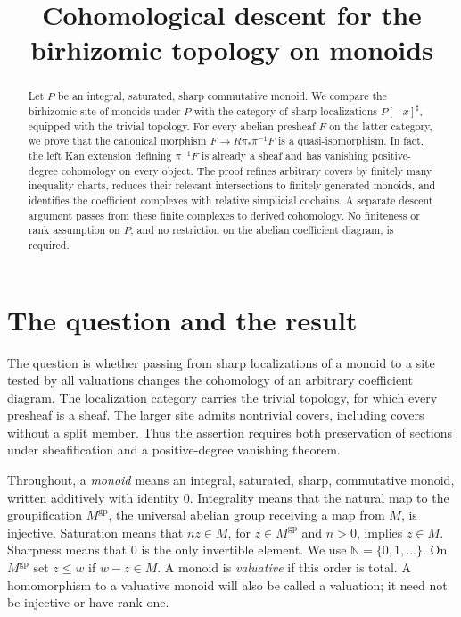 \documentclass[11pt]{article}
\title{Cohomological descent for the birhizomic topology on monoids}
\author{}
\date{}
\theoremstyle{definition}
\theoremstyle{remark}
\newcommand{\N}{\mathbb N}
\newcommand{\gp}{\mathrm{gp}}
\begin{document}
\maketitle

\begin{abstract}
Let $P$ be an integral, saturated, sharp commutative monoid. We compare the birhizomic site of monoids under $P$ with the category of sharp localizations $P[-x]^\sharp$, equipped with the trivial topology. For every abelian presheaf $F$ on the latter category, we prove that the canonical morphism $F\to R\pi_*\pi^{-1}F$ is a quasi-isomorphism. In fact, the left Kan extension defining $\pi^{-1}F$ is already a sheaf and has vanishing positive-degree cohomology on every object. The proof refines arbitrary covers by finitely many inequality charts, reduces their relevant intersections to finitely generated monoids, and identifies the coefficient complexes with relative simplicial cochains. A separate descent argument passes from these finite complexes to derived cohomology. No finiteness or rank assumption on $P$, and no restriction on the abelian coefficient diagram, is required.
\end{abstract}

\section{The question and the result}

The question is whether passing from sharp localizations of a monoid to a site tested by all valuations changes the cohomology of an arbitrary coefficient diagram. The localization category carries the trivial topology, for which every presheaf is a sheaf. The larger site admits nontrivial covers, including covers without a split member. Thus the assertion requires both preservation of sections under sheafification and a positive-degree vanishing theorem.

Throughout, a \emph{monoid} means an integral, saturated, sharp, commutative monoid, written additively with identity $0$. Integrality means that the natural map to the groupification $M^{\gp}$, the universal abelian group receiving a map from $M$, is injective. Saturation means that $nz\in M$, for $z\in M^{\gp}$ and $n>0$, implies $z\in M$. Sharpness means that $0$ is the only invertible element. We use $\N=\{0,1,\ldots\}$. On $M^{\gp}$ set $z\leq w$ if $w-z\in M$. A monoid is \emph{valuative} if this order is total. A homomorphism to a valuative monoid will also be called a valuation; it need not be injective or have rank one.
\end{document}
